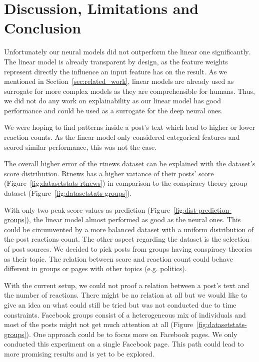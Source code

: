 \section{Discussion, Limitations and Conclusion}
\label{sec:conclusion}
Unfortunately our neural models did not outperform the linear one significantly. 
The linear model is already transparent by design, as the feature weights 
represent directly the influence an input feature has on the result. As we mentioned in
Section~\ref{sec:related_work}, linear models are already used as surrogate for more 
complex models as they are comprehensible for humans. Thus, we did not do any work on 
explainability as our linear model has good performance and could be used as a surrogate
for  the deep neural ones.

We were hoping to find patterns inside a post's text which lead to higher or lower
reaction counts. As the  linear model only considered categorical features and scored
similar performance, this was  not the case. 

The overall higher error of the rtnews dataset can be explained with the dataset's score 
distribution. Rtnews has a higher variance of their posts' score
(Figure~\ref{fig:datasetstats-rtnews}) in comparison to the conspiracy theory group dataset
(Figure~\ref{fig:datasetstats-groups}). 

With only two peak score values as prediction (Figure~\ref{fig:dist-prediction-groups}),
the  linear model almost performed as good as the neural ones. This could be circumvented
by  a more balanced dataset with a uniform distribution of the post reactions count. The
other aspect regarding the dataset is the selection of post sources. We decided to pick
posts  from groups having conspiracy theories as their topic. The relation between score and 
reaction count could behave different in groups or pages with other topics (e.g.
politics).

With the current setup, we could not proof a relation between a post's text and the number
of reactions. There might be no relation at all but we would like to give an idea on what
could still be tried but was not conducted due to time constraints. Facebook  groups
consist of a heterogeneous mix of individuals and most of the posts might not get  much
attention at all (Figure~\ref{fig:datasetstats-groups}). One approach could be to  focus
more on Facebook pages. We only conducted this experiment on a single Facebook page. This
path could lead to more promising results and is yet to be explored.


